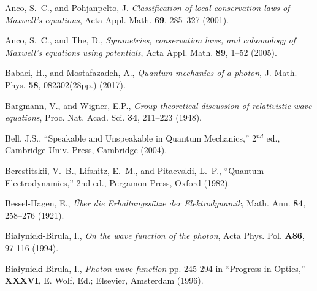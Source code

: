 \documentclass[11pt]{article}
\theoremstyle{definition}
\numberwithin{equation}{section}
\begin{document}
\baselineskip=10pt

%
\begin{thebibliography}{[KTZ2020]}
	Anco, S.~C., and Pohjanpelto, J.
	\textit{Classification of local conservation laws of Maxwell's equations},
	Acta Appl. Math. \textbf{69}, 285--327 (2001).\vspace{-4pt}

	Anco, S.~C., and The, D.,
	\textit{Symmetries, conservation laws, and cohomology of Maxwell's equations using potentials},
	Acta Appl. Math. \textbf{89}, 1--52 (2005).\vspace{-4pt}

	Babaei, H., and Mostafazadeh, A.,
	\textit{Quantum mechanics of a photon},
  J. Math. Phys. \textbf{58}, 082302(28pp.) (2017).\vspace{-4pt}

        Bargmann, V., 
        and 
        Wigner, E.P.,
        \textit{Group-theoretical discussion of relativistic wave equations},
        Proc. Nat. Acad. Sci. \textbf{34}, 211--223 (1948).

        Bell, J.S.,
        ``Speakable and Unspeakable in Quantum Mechanics,'' 2$^{nd}$ ed.,
        Cambridge Univ. Press, Cambridge (2004).

        Berestitskii, V.~B.,
        Lifshitz, E.~M., 
        and
        Pitaevskii, L.~P.,
                ``{Quantum Electrodynamics},'' 2nd ed., %
        Pergamon Press, Oxford (1982).\vspace{-4pt}

  Bessel-Hagen, E.,
  {\it \"Uber die Erhaltungss\"atze der Elektrodynamik},
  Math. Ann. \textbf{84}, 258--276 (1921).\vspace{-4pt}

        Bia\l ynicki-Birula, I.,
                {\it On the wave function of the photon},
        Acta Phys. Pol. \textbf{A86}, 97-116 (1994).\vspace{-4pt}

	Bia{\l}ynicki-Birula, I.,
	\textit{Photon wave function}
	pp. 245-294 in ``Progress in Optics,'' \textbf{XXXVI},
        E. Wolf, Ed.; Elsevier, Amsterdam (1996).\vspace{-4pt}


\end{thebibliography}
\end{document}
